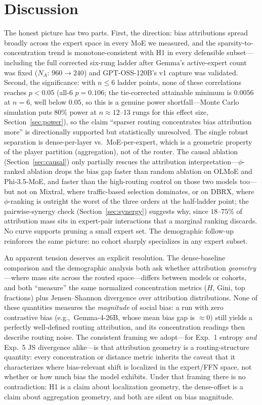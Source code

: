 \documentclass[sigconf]{acmart}
\begin{document}
\section{Discussion}
\label{sec:disc}
The honest picture has two parts. First, the direction: bias attributions
spread broadly across the expert space in every MoE we measured, and the
sparsity-to-concentration trend is monotone-consistent with H1 in every
defensible subset---including the full corrected six-rung ladder after
Gemma's active-expert count was fixed ($N_A$: $960 \rightarrow 240$) and
GPT-OSS-120B's v1 capture was validated. Second, the significance: with
$n \le 6$ ladder points, none of these correlations reaches $p < 0.05$
(all-6 $p = 0.106$; the tie-corrected attainable minimum is $0.0056$ at
$n=6$, well below $0.05$, so this is a genuine power shortfall---Monte
Carlo simulation puts $80\%$ power at $n\approx12$--$13$ rungs for this
effect size, Section~\ref{sec:power}), so the claim ``sparser routing
concentrates bias attribution
more'' is directionally supported but statistically unresolved. The single
robust separation is dense-per-layer vs.\ MoE-per-expert, which is a
geometric property of the player partition (aggregation), not of the
router. The causal ablation (Section~\ref{sec:causal}) only partially
rescues the attribution interpretation---$\phi$-ranked ablation drops the
bias gap faster than random ablation on OLMoE and Phi-3.5-MoE, and faster
than the high-routing control on those two models too---but not on
Mixtral, where traffic-based selection dominates, or on DBRX, where
$\phi$-ranking is outright the worst of the three orders at the
half-ladder point; the pairwise-synergy check (Section~\ref{sec:synergy})
suggests why, since $18$--$75\%$ of attribution mass sits in
expert-pair interactions that a marginal ranking discards. No curve
supports pruning a small expert set. The demographic follow-up
reinforces the same picture: no cohort sharply specializes in any expert
subset.

An apparent tension deserves an explicit resolution. The dense-baseline
comparison and the demographic analysis both ask whether attribution
\emph{geometry}---where mass sits across the routed space---differs
between models or cohorts, and both ``measure'' the same normalized
concentration metrics ($H$, Gini, top fractions) plus Jensen--Shannon
divergence over attribution distributions. None of these quantities
measures the \emph{magnitude} of social bias: a run with zero contrastive
bias (e.g.,\ Gemma-4-26B, whose mean bias gap is $\approx 0$) still yields a
perfectly well-defined routing attribution, and its concentration readings
then describe routing noise. The consistent framing we adopt---for
Exp.~1 entropy \emph{and} Exp.~5 JS divergence alike---is that attribution
geometry is a routing-structure quantity: every concentration or distance
metric inherits the caveat that it characterizes where bias-relevant shift
is localized in the expert/FFN space, not whether or how much bias the
model exhibits. Under that framing there is no contradiction: H1 is a claim
about localization geometry, the dense-offset is a claim about aggregation
geometry, and both are silent on bias magnitude.
\end{document}
